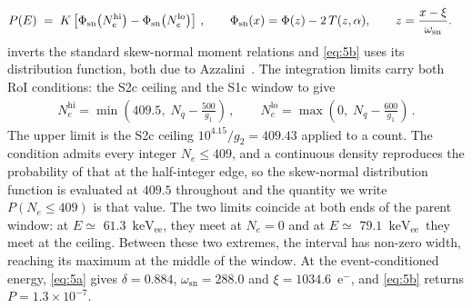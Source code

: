 \documentclass[11pt,a4paper]{article}
\newcommand{\keVee}{\ensuremath{\mathrm{keV_{ee}}}}
\begin{document}
\begin{align}
    \label{eq:5b}
    P(E)\;&=\;K\left[\Phi_{\rm sn}\!\left(N_e^{\rm hi}\right) 
        - \Phi_\mathrm{sn}\!\left(N_e^\mathrm{lo}\right)\right]\,, \qquad
    \Phi_\mathrm{sn}(x)=\Phi(z)-2\,T(z,\alpha),\qquad
    z=\frac{x-\xi}{\omega_\mathrm{sn}}.
\end{align}
 inverts the standard skew-normal moment relations and \cref{eq:5b}
uses its distribution function, both due to
Azzalini~\cite{Azzalini}. The integration limits carry both RoI
conditions: the S2c ceiling and the S1c window to give
\begin{align}
    N_e^\mathrm{hi}=\min\!\left(409.5,\;N_q-\frac{500}{g_1}\right)\,, \qquad
    N_e^\mathrm{lo}=\max\!\left(0,\;N_q-\frac{600}{g_1}\right)\,.
\end{align}
The upper limit is the S2c ceiling \(10^{4.15}/g_2=409.43\) applied to a
count. The condition admits every integer \(N_e\le409\), and a continuous
density reproduces the probability of that at the half-integer edge, so the
skew-normal distribution function is evaluated at \(409.5\) throughout
and the quantity we write \(P(N_e\le409)\) is that value. The two limits
coincide at both ends of the parent window: at \(E\simeq\)
\(61.3\)~\keVee, they meet at \(N_e=0\) and at \(E\simeq\)
\(79.1\)~\keVee\ they meet at the ceiling. Between these two extremes,
the interval has non-zero width, reaching its maximum at the middle of
the window. At the event-conditioned energy, \cref{eq:5a} gives
\(\delta=0.884\), \(\omega_\mathrm{sn}=288.0\) and
\(\xi=1034.6\)~e\(^-\), and \cref{eq:5b} returns \(P=1.3\times10^{-7}\).
\end{document}
